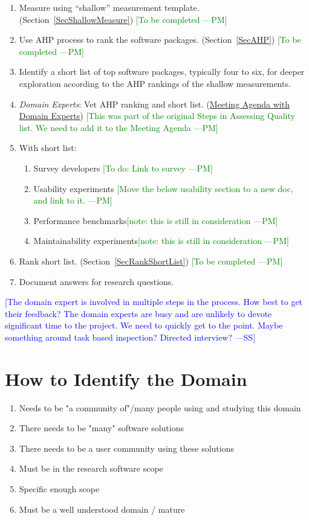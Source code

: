 \documentclass[letterpaper,cleveref]{lipics-v2019}
\newcommand{\authornote}[3]{\textcolor{#1}{[#3 ---#2]}}
\newcommand{\authornote}[3]{}
\newcommand{\wss}[1]{\authornote{blue}{SS}{#1}} %
\newcommand{\pmi}[1]{\authornote{green}{PM}{#1}} %
\theoremstyle{definition}
\begin{document}
\begin{enumerate}
\item Measure using ``shallow'' measurement template. (Section~\ref{SecShallowMeasure}) \pmi{To be completed}
\item Use AHP process to rank the software packages. (Section~\ref{SecAHP}) \pmi{To be completed}
\item Identify a short list of top software packages, typically four to six, for deeper exploration according to the AHP rankings of the shallow measurements.
\item \emph{Domain Experts}: Vet AHP ranking and short list. (\href{run:Meeting Agenda with Domain Experts.pdf}{Meeting Agenda with Domain Experts}) \pmi{This was part of the original Steps in Assessing Quality list. We need to add it to the Meeting Agenda}
\item With short list:
\begin{enumerate}
\item Survey developers \pmi{To do: Link to survey}
\item Usability experiments \pmi{Move the below usability section to a new doc, and link to it.}
\item Performance benchmarks\pmi{note: this is still in consideration}
\item Maintainability experiments\pmi{note: this is still in consideration}
\end{enumerate}
\item Rank short list. (Section~\ref{SecRankShortList}) \pmi{To be completed}
\item Document answers for research questions.
\end{enumerate}

\wss{The domain expert is involved in multiple steps in the process.  How best
  to get their feedback?  The domain experts are busy and are unlikely to devote
  significant time to the project.  We need to quickly get to the point.  Maybe
  something around task based inspection?  Directed interview?}


\section{How to Identify the Domain} \label{SecIdentifyDomain}
\begin{enumerate}
	\item Needs to be "a community of"/many people using and studying this domain
	\item There needs to be "many" software solutions
	\item There needs to be a user community using these solutions
	\item Must be in the research software scope
	\item Specific enough scope
	\item Must be a well understood domain / mature
\end{enumerate}
\end{document}
